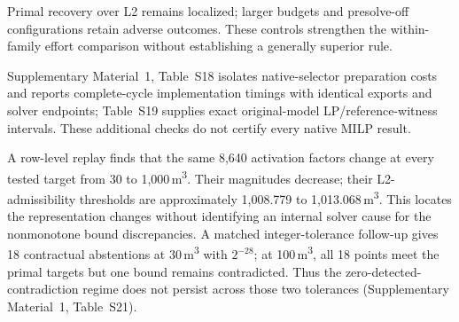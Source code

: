 \documentclass[11pt]{article}
\theoremstyle{definition}
\theoremstyle{remark}
\begin{document}
\begin{table}[tb]
\centering\small\setlength{\tabcolsep}{3.5pt}
\caption{Matched controls on six known models and seeds 59,71,89; automatic
presolve, power target 0.01 MW and IntFeasTol=$10^{-9}$. Each row has 18 calls;
control budgets pass at each listed volume target, in m\textsuperscript{3}.
B/G follows Table~\ref{tab:activation-summary}. Work is the geometric mean of all
terminal calls, including flagged reports; ratios are paired by model/seed.
The 36 Base/Base-tight calls follow the original sensitivity. Supplementary
Material~1, Table~S23 gives the directed protocol; Table~S17 retains the full
seven-budget study. No MILP optimality certificate is implied.}
\label{tab:precision-frontier-main}

\end{table}

\begin{table}[tb]
\centering\small\setlength{\tabcolsep}{5pt}
\caption{Complete-process times in the interleaved confirmation at
100\,m\textsuperscript{3}. Seconds are geometric means of three seeds per
model; ratios are paired geometric means against each control. B denotes
Budget-L2. Time includes generation, selection/export where applicable,
import checks, solving and returned-point verification in a fresh process.
Compilation and acquisition of historical witnesses are separate. Ratios below
one indicate a faster process on the shared host; they do not establish a
hardware-independent threshold for applying scaling.}
\label{tab:base-controls-time}

\end{table}

Primal recovery over L2 remains localized; larger budgets and presolve-off
configurations retain adverse outcomes. These controls strengthen the
within-family effort comparison without establishing a generally superior rule.

Supplementary Material~1, Table~S18 isolates native-selector preparation costs
and reports complete-cycle implementation timings with identical exports and solver
endpoints; Table~S19 supplies exact original-model LP/reference-witness
intervals. These additional checks do not certify every native MILP result.

A row-level replay finds that the same 8,640 activation factors change at every
tested target from 30 to 1,000\,m\textsuperscript{3}. Their magnitudes decrease;
their L2-admissibility thresholds are approximately 1,008.779 to
1,013.068\,m\textsuperscript{3}. This locates the representation changes without
identifying an internal solver cause for the nonmonotone bound discrepancies.
A matched integer-tolerance follow-up gives 18 contractual abstentions at
30\,m\textsuperscript{3} with $2^{-28}$; at 100\,m\textsuperscript{3}, all
18 points meet the primal targets but one bound remains contradicted. Thus the
zero-detected-contradiction regime does not persist across those two tolerances
(Supplementary Material~1, Table~S21).
\end{document}
